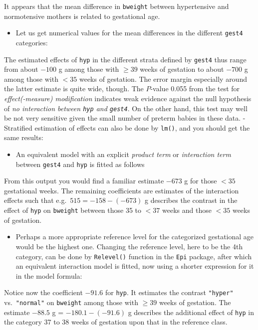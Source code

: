 \documentclass[
]{book}
\providecommand{\tightlist}{%
  \setlength{\itemsep}{0pt}\setlength{\parskip}{0pt}}
\begin{document}
It appears that the mean difference in \texttt{bweight} between
hypertensive and normotensive
mothers is related to gestational age.

\begin{itemize}
\tightlist
\item
  Let us get numerical values for the mean differences
  in the different \texttt{gest4} categories:
\end{itemize}

The estimated effects of \texttt{hyp} in the different strata defined by \texttt{gest4} thus
range from about \(-100\) g among those with \(\geq 39\) weeks of gestation to about \(-700\) g among those
with \(< 35\) weeks of gestation. The error margin especially
around the latter estimate is quite wide, though.
The \(P\)-value 0.055 from the test for
\emph{effect(-measure) modification} indicates weak evidence
against the null hypothesis of \emph{no interaction between \texttt{hyp} and \texttt{gest4}}.
On the other hand, this test may well be not very sensitive given
the small number of preterm babies in these data.
- Stratified estimation of effects can also be done by \texttt{lm()},
and you should get the same results:

\begin{itemize}
\tightlist
\item
  An equivalent model with an explicit \emph{product term} or
  \emph{interaction term} between \texttt{gest4} and \texttt{hyp} is
  fitted as follows
\end{itemize}

From this output you would find a familiar estimate \(-673\) g for those \(< 35\) gestational weeks.
The remaining coefficients are estimates of the interaction effects such that e.g.~\(515 = -158 - (-673)\) g
describes the contrast in the effect of \texttt{hyp} on \texttt{bweight}
between those 35 to \(< 37\) weeks and those \(< 35\) weeks of gestation.

\begin{itemize}
\tightlist
\item
  Perhaps a more appropriate reference level for the categorized gestational age would be the highest one.
  Changing the reference level, here to be the 4th category,
  can be done by \texttt{Relevel()} function in the \texttt{Epi} package,
  after which an equivalent interaction model is fitted, now using a shorter
  expression for it in the model formula:
\end{itemize}

Notice now the coefficient \(-91.6\) for \texttt{hyp}.
It estimates the contrast \texttt{"hyper"} vs.~\texttt{"normal"} on
\texttt{bweight} among those with \(\geq 39\) weeks of gestation.
The estimate \(-88.5\) g = \(-180.1 -(-91.6)\) g describes the additional
effect of \texttt{hyp} in the category 37 to 38 weeks of gestation upon
that in the reference class.
\end{document}
